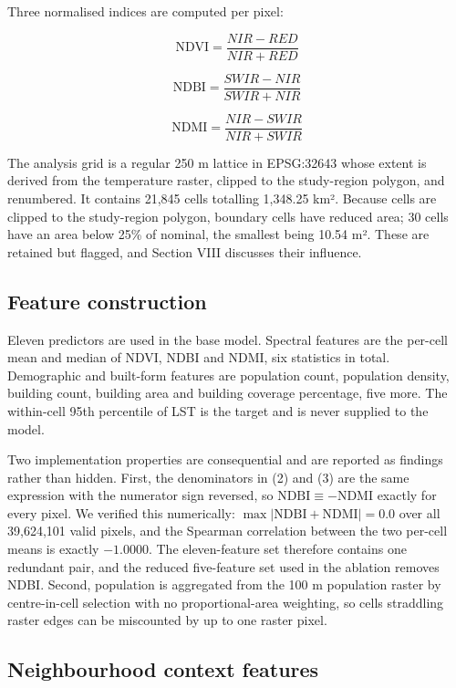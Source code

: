 \documentclass[conference]{IEEEtran}
\begin{document}
Three normalised indices are computed per pixel:

\[\mathrm{NDVI} = \frac{NIR - RED}{NIR + RED} \tag{1}\]

\[\mathrm{NDBI} = \frac{SWIR - NIR}{SWIR + NIR} \tag{2}\]

\[\mathrm{NDMI} = \frac{NIR - SWIR}{NIR + SWIR} \tag{3}\]

The analysis grid is a regular 250 m lattice in EPSG:32643 whose extent is derived from the
temperature raster, clipped to the study-region polygon, and renumbered. It contains 21,845 cells
totalling 1,348.25 km². Because cells are clipped to the study-region polygon, boundary cells have
reduced area; 30 cells have an area below 25\% of nominal, the smallest being 10.54 m². These are
retained but flagged, and Section VIII discusses their influence.

\subsection{Feature construction}\label{c.-feature-construction}

Eleven predictors are used in the base model. Spectral features are the per-cell mean and median
of NDVI, NDBI and NDMI, six statistics in total. Demographic and built-form features are population
count, population density, building count, building area and building coverage percentage, five
more. The within-cell 95th percentile of LST is the target and is never supplied to the model.

Two implementation properties are consequential and are reported as findings rather than hidden.
First, the denominators in (2) and (3) are the same expression with the numerator sign reversed, so
\(\mathrm{NDBI} \equiv -\mathrm{NDMI}\) exactly for every pixel. We verified this numerically:
\(\max|\mathrm{NDBI} + \mathrm{NDMI}| = 0.0\) over all 39,624,101 valid pixels, and the Spearman
correlation between the two per-cell means is exactly \(-1.0000\). The eleven-feature set therefore
contains one redundant pair, and the reduced five-feature set used in the ablation removes NDBI.
Second, population is aggregated from the 100 m population raster by centre-in-cell selection with
no proportional-area weighting, so cells straddling raster edges can be miscounted by up to one raster
pixel.

\subsection{Neighbourhood context features}\label{d.-neighbourhood-context-features}
\end{document}
